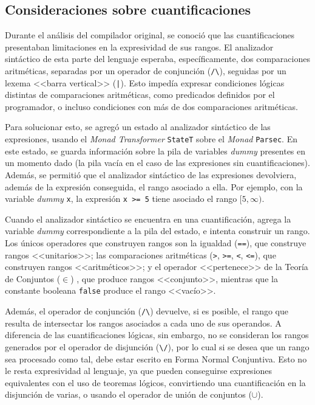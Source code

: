 \subsection{Consideraciones sobre cuantificaciones}

Durante el análisis del compilador original, se conoció que las cuantificaciones
presentaban limitaciones en la expresividad de sus rangos. El analizador
sintáctico de esta parte del lenguaje esperaba, específicamente, dos
comparaciones aritméticas, separadas por un operador de conjunción
(\texttt{/\textbackslash{}}), seguidas por un lexema <<barra vertical>>
(\texttt{|}). Esto impedía expresar condiciones lógicas distintas de
comparaciones aritméticas, como predicados definidos por el programador, o
incluso condiciones con más de dos comparaciones aritméticas.

Para solucionar esto, se agregó un estado al analizador sintáctico de las
expresiones, usando el \emph{Monad Transformer} \texttt{StateT} sobre el
\emph{Monad} \texttt{Parsec}. En este estado, se guarda información sobre la
pila de variables \emph{dummy} presentes en un momento dado (la pila vacía en el
caso de las expresiones sin cuantificaciones). Además, se permitió que el
analizador sintáctico de las expresiones devolviera, además de la expresión
conseguida, el rango asociado a ella. Por ejemplo, con la variable \emph{dummy}
\texttt{x}, la expresión \texttt{x >= 5} tiene asociado el rango $[5, \infty)$.

Cuando el analizador sintáctico se encuentra en una cuantificación, agrega la
variable \emph{dummy} correspondiente a la pila del estado, e intenta construir
un rango. Los únicos operadores que construyen rangos son la igualdad
(\texttt{==}), que construye rangos <<unitarios>>; las comparaciones aritméticas
(\texttt{>}, \texttt{>=}, \texttt{<}, \texttt{<=}), que construyen rangos
<<aritméticos>>; y el operador <<pertenece>> de la Teoría de Conjuntos ($\in$)
, que produce rangos <<conjunto>>, mientras que la
constante booleana \texttt{false} produce el rango <<vacío>>.

Además, el operador de conjunción (\texttt{/\textbackslash{}}) devuelve, si es
posible, el rango que resulta de intersectar los rangos asociados a cada uno de
sus operandos. A diferencia de las cuantificaciones lógicas, sin embargo, no se
consideran los rangos generados por el operador de disjunción
(\texttt{\textbackslash{}/}), por lo cual si se desea que un rango sea procesado
como tal, debe estar escrito en Forma Normal Conjuntiva. Esto no le resta
expresividad al lenguaje, ya que pueden conseguirse expresiones equivalentes con
el uso de teoremas lógicos, convirtiendo una cuantificación en la disjunción de
varias, o usando el operador de unión de conjuntos ($\cup$).

